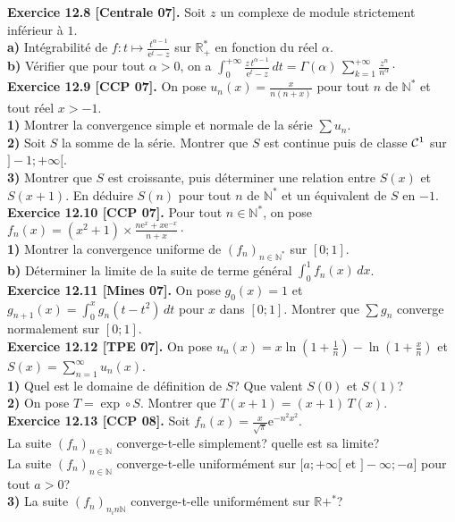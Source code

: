 \documentclass[a4paper,12pt,francais]{article}
\newcommand{\field}[1]{\mathbb{#1}}
\newcommand{\N}{\field{N}}
\newcommand{\R}{\field{R}}
\newcommand{\e}{\mbox{e}}
\begin{document}
\noindent
{\bf Exercice 12.8 [Centrale 07].} Soit $z$ un complexe de module strictement inférieur à $1$.\\
\indent
{\bf a)} Intégrabilité de $f: t \mapsto \frac{t^{\alpha-1}}{\e^t-z}$ sur $\R_+^*$ en fonction du réel $\alpha$.\\ 
\indent
{\bf b)} Vérifier que pour tout $\alpha >0$, on a $\displaystyle \int_0^{+\infty} \frac{z\, t^{\alpha-1}}{\e^t-z}\, dt = \Gamma(\alpha) \, \sum_{k=1}^{+\infty} \frac{z^n}{n^\alpha}\cdot$\\

\noindent
{\bf Exercice 12.9 [CCP 07].} On pose $u_n(x)=\frac{x}{n(n+x)}$ pour tout $n$ de $\N^*$ et tout réel $x>-1$.\\
\indent
{\bf 1)} Montrer la convergence simple et normale de la série $\sum u_n$.\\
\indent
{\bf 2)} Soit $S$ la somme de la série. Montrer que $S$ est continue puis de classe ${\cal{C}}^1$ sur $]-1;+\infty[$.\\
\indent
{\bf 3)} Montrer que $S$ est croissante, puis déterminer une relation entre $S(x)$ et $S(x+1)$. En déduire $S(n)$ pour tout $n$ de $\N^*$ et un équivalent de $S$ en $-1$.\\

\noindent
{\bf Exercice 12.10 [CCP 07].} Pour tout $n\in \N^*$, on pose $\displaystyle f_n(x)=(x^2+1)\times \frac{n \e^x+x\e^{-x}}{n+x} \cdot$\\
\indent
{\bf 1)} Montrer la convergence uniforme de $(f_n)_{n \in \N^*}$ sur $[0;1]$.\\
\indent
{\bf b)} Déterminer la limite de la suite de terme général $\int_0^1 f_n(x)\, dx$.\\ 

\noindent
{\bf Exercice 12.11 [Mines 07].} 
On pose $g_0(x)=1$ et $g_{n+1}(x)=\int_0^xg_n(t-t^2)\, dt $ pour $x$ dans $[0;1]$. Montrer que $\sum g_n$ converge normalement sur $[0;1]$.\\

\noindent
{\bf Exercice 12.12 [TPE 07].} On pose $u_n(x)=x \ln \left( 1+\frac{1}{n} \right)- \ln \left( 1+\frac{x}{n} \right)$ et $S(x)=\displaystyle \sum_{n=1}^\infty u_n(x)$.\\
\indent
{\bf 1)} Quel est le domaine de définition de $S$? Que valent $S(0)$ et $S(1)$?\\
\indent
{\bf 2)} On pose $T=\exp \circ S$. Montrer que $T(x+1)=(x+1)\, T(x)$.\\

\noindent
{\bf Exercice 12.13 [CCP 08].} Soit $f_n(x)=\frac{x}{\sqrt{\pi}}\e^{-n^2x^2}$. \\
 La suite $(f_n)_{n \in \N}$ converge-t-elle simplement? quelle est sa limite?\\
 La suite $(f_n)_{n \in \N}$ converge-t-elle uniformément sur $[a;+\infty[$ et $]-\infty;-a]$ pour tout $a>0$?\\
\indent
{\bf 3)} La suite $(f_n)_{n _in \N}$ converge-t-elle uniformément sur $\R+^*$?\\
\end{document}
